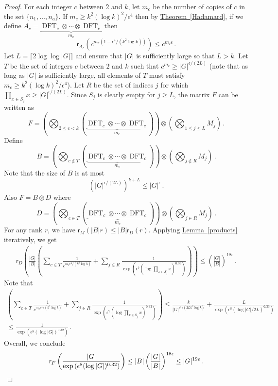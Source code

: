 \documentclass[11pt]{article}
\numberwithin{equation}{section}
\theoremstyle{definition}
\theoremstyle{plain}
\newcommand{\expref}[2]{\hyperref[#2]{#1~\ref{#2}}}
\theoremstyle{definition}
\DeclareMathOperator{\DFT}{DFT}
\begin{document}
\begin{proof}
For each integer $c$ between $2$ and $k$, let $m_c$ be the number of copies of $c$ in the set $\{n_1, \dots , n_a \}$.  If $m_c \geq k^2 (\log k)^2/\epsilon^4 $ then by \expref{Theorem}{Hadamard}, if we define %
$A_c = \underbrace{\DFT_c \otimes \cdots \otimes \DFT_c}_{\text{$m_c$}}$ %
 then 
\[
\textsf{r}_{A_c}\left(c^{m_c(1 - \epsilon^4/(k^2 \log k))}\right) \leq c^{m_c \epsilon} \,.
\]
Let $L = \lceil 2\log \log |G| \rceil$ and ensure that $|G|$ is sufficiently large so that $L > k$.  Let $T$ be the set of integers $c$ between $2$ and $k$ such that $c^{m_c} \geq |G|^{\epsilon/(2L)}$ (note that as long as $|G|$ is sufficiently large, all elements of $T$ must satisfy $m_c \geq k^2 (\log k)^2/\epsilon^4 $).  Let $R$ be the set of indices $j$ for which $\prod_{x \in S_j}x \geq |G|^{\epsilon/(2L)}$.  Since $S_j$ is clearly empty for $j \geq L$, the matrix $F$ can be written as 
%
%
%
%
\[
F = \left( \bigotimes_{2 \leq c < k} \left( \underbrace{\DFT_c \otimes \cdots \otimes \DFT_c}_{\text{$m_c$}}\right) \right) \otimes \left(\bigotimes_{1 \leq j \leq L} M_j \right) \,.
\]
%
Define 
%
%
\[B = \left( \bigotimes_{c \notin T} \left( \underbrace{\DFT_c \otimes \cdots \otimes \DFT_c}_{\text{$m_c$}}\right) \right) \otimes \left(\bigotimes_{j \notin R} M_j \right) \,. \]
%
Note that the size of $B$ is at most 
\[
\left( |G|^{\epsilon/(2L)}\right)^{k + L} \leq |G|^{\epsilon} \,.
\]
Also $F = B \otimes D$ where
%
%
%
%
\[
D =  \left( \bigotimes_{c \in T} \left( \underbrace{\DFT_c \otimes \cdots \otimes \DFT_c}_{\text{$m_c$}}\right) \right) \otimes \left(\bigotimes_{j \in R} M_j \right) \,.
\]
%
For any rank $r$, %
we have %
$\textsf{r}_M(|B|r) \leq |B|\textsf{r}_D(r)$.  Applying \expref{Lemma}{products} iteratively, we get 
\begin{align*}
\textsf{r}_D\left(\frac{|G|}{|B|}\left( \sum_{c \in T}\frac{1}{c^{m_c\epsilon^4/(k^2 \log k)}} + \sum_{j \in R}\frac{1}{\exp\left(\epsilon^7 (\log \prod_{x \in S_j}x )^{0.33}\right)} \right)\right) \leq \left(\frac{|G|}{|B|}\right)^{18 \epsilon} \,.
\end{align*}
Note that 
\begin{align*}
\left( \sum_{c \in T}\frac{1}{c^{m_c \epsilon^4/(k^2 \log k)}} + \sum_{j \in R}\frac{1}{\exp\left(\epsilon^7 (\log \prod_{x \in S_j}x )^{0.33}\right)} \right) \leq \frac{k}{|G|^{\epsilon^5/(2Lk^2 \log k)}} + \frac{L}{\exp\left(\epsilon^8 (\log |G|/2L)^{0.33}\right)} \\ \leq \frac{1}{\exp\left(\epsilon^8 (\log |G|)^{0.32}\right)} \,.
\end{align*}
Overall, we conclude
\[
\textsf{r}_F\left(\frac{|G|}{\exp\left(\epsilon^8 (\log |G|)^{0.32}\right)}\right) \leq |B|\left(\frac{|G|}{|B|}\right)^{18 \epsilon} \leq |G|^{19 \epsilon} \,.\qedhere
\]
\end{proof}
%
\end{document}
